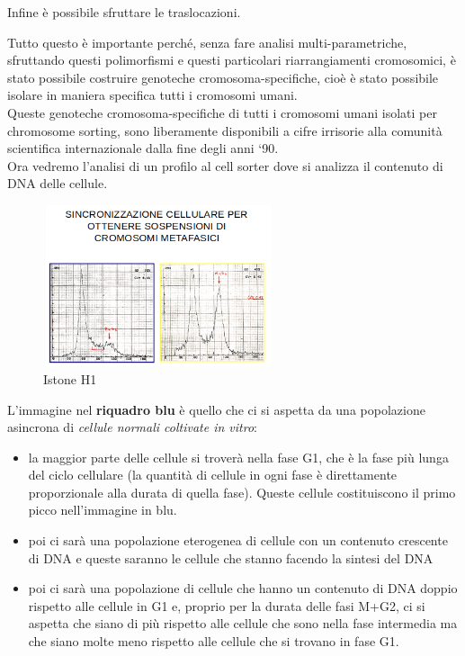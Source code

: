 \documentclass[11pt]{book}
\begin{document}
Infine è possibile sfruttare le traslocazioni.

Tutto questo è importante perché, senza fare analisi multi-parametriche, sfruttando questi polimorfismi e questi particolari riarrangiamenti cromosomici, è stato possibile costruire genoteche cromosoma-specifiche, cioè è stato possibile isolare in maniera specifica tutti i cromosomi umani.\\
Queste genoteche cromosoma-specifiche di tutti i cromosomi umani isolati per chromosome sorting, sono liberamente disponibili a cifre irrisorie alla comunità scientifica internazionale dalla fine degli anni ‘90.\\

Ora vedremo l’analisi di un profilo al cell sorter dove si analizza il contenuto di DNA delle cellule.

\begin{figure}
    \includegraphics[width=0.60\textwidth]{img/sincronizzazione_cellule.png}
  \caption{Istone H1}
\end{figure}

L’immagine nel \textbf{riquadro blu} è quello che ci si aspetta da una popolazione asincrona di \emph{cellule normali coltivate in vitro}:
\begin{itemize}
\item la maggior parte delle cellule si troverà nella fase G1, che è la fase più lunga del ciclo cellulare (la quantità di cellule in ogni fase è direttamente proporzionale alla durata di quella fase). Queste cellule costituiscono il primo picco nell’immagine in blu.
\item poi ci sarà una popolazione eterogenea di cellule con un contenuto crescente di DNA e queste saranno le cellule che stanno facendo la sintesi del DNA
\item poi ci sarà una popolazione di cellule che hanno un contenuto di DNA doppio rispetto alle cellule in G1 e, proprio per la durata delle fasi M+G2, ci si aspetta che siano di più rispetto alle cellule che sono nella fase intermedia ma che siano molte meno rispetto alle cellule che si trovano in fase G1.
\end{itemize}
\end{document}
